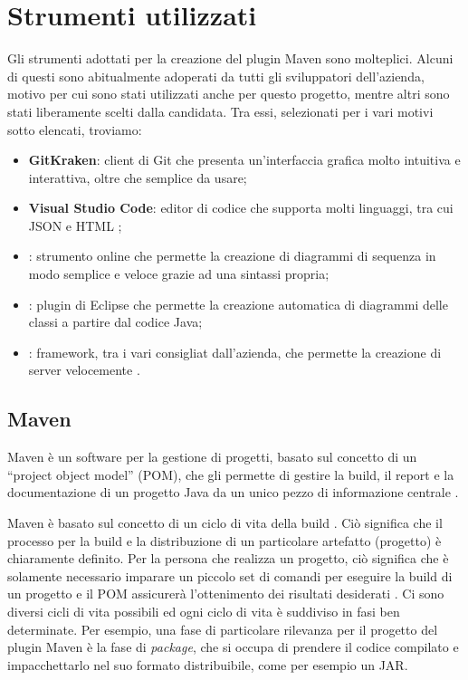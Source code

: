 
\section{Strumenti utilizzati}
Gli strumenti adottati per la creazione del plugin Maven sono molteplici.
Alcuni di questi sono abitualmente adoperati da tutti gli sviluppatori dell'azienda, motivo per cui sono stati utilizzati anche per questo progetto, mentre altri sono stati liberamente scelti dalla candidata.
Tra essi, selezionati per i vari motivi sotto elencati, troviamo:
\begin{itemize}
    \item \textbf{GitKraken}: client di Git che presenta un'interfaccia grafica molto intuitiva e interattiva, oltre che semplice da usare;
    \item \textbf{Visual Studio Code}: editor di codice che supporta molti linguaggi, tra cui JSON e HTML \cite{site:visual-studio-code};
    \item {}: strumento online che permette la creazione di diagrammi di sequenza in modo semplice e veloce grazie ad una sintassi propria;
    \item {}: plugin di Eclipse che permette la creazione automatica di diagrammi delle classi a partire dal codice Java;
    \item {}: framework, tra i vari consigliat dall'azienda, che permette la creazione di server velocemente \cite{site:meecrowave}.
\end{itemize}

    \subsection{Maven} \label{mavenSection} %
        
    Maven è un software per la gestione di progetti, basato sul concetto di un ``project object model'' (POM), che gli permette di gestire la build, il report e la documentazione di un progetto Java da un unico pezzo di informazione centrale \cite{site:maven-introduzione}.

    Maven è basato sul concetto di un ciclo di vita della build .
    Ciò significa che il processo per la build e la distribuzione di un particolare artefatto (progetto) è chiaramente definito. 
    Per la persona che realizza un progetto, ciò significa che è solamente necessario imparare un piccolo set di comandi per eseguire la build di un progetto e il POM assicurerà l'ottenimento dei risultati desiderati \cite{site:maven-lifecycle}.
    Ci sono diversi cicli di vita possibili ed ogni ciclo di vita è suddiviso in fasi ben determinate.
    Per esempio, una fase di particolare rilevanza per il progetto del plugin Maven è la fase di \emph{package}, che si occupa di prendere il codice compilato e impacchettarlo nel suo formato distribuibile, come per esempio un JAR. 

